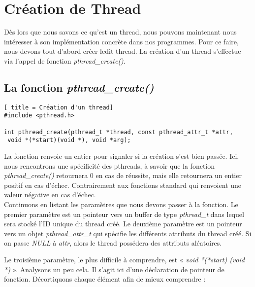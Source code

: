 \section{Création de Thread}
Dès lors que nous savons ce qu'est un thread, nous pouvons maintenant nous intéresser à son implémentation concrète dans nos programmes. Pour ce faire, nous devons tout d'abord créer ledit thread. La création d'un thread s'effectue via l'appel de fonction \textit{pthread\_create()}.
\\

\subsection{La fonction \textit{pthread\_create()}}
\begin{lstlisting}[ title = Création d'un thread]
#include <pthread.h>

int pthread_create(pthread_t *thread, const pthread_attr_t *attr,
 void *(*start)(void *), void *arg);
\end{lstlisting}
\vspace{\baselineskip}


La fonction renvoie un entier pour signaler si la création s'est bien passée. Ici, nous rencontrons une spécificité des pthreads, à savoir que la fonction \textit{pthread\_create()} retournera 0 en cas de réussite, mais elle retournera un entier positif en cas d'échec. Contrairement aux fonctions standard qui renvoient une valeur négative en cas d'échec.
\\

Continuons en listant les paramètres que nous devons passer à la fonction. Le premier paramètre est un pointeur vers un buffer de type \textit{pthread\_t} dans lequel sera stocké l'ID unique du thread créé. Le deuxième paramètre est un pointeur vers un objet \textit{pthread\_attr\_t} qui spécifie les différents attributs du thread créé. Si on passe \textit{NULL} à \textit{attr}, alors le thread possédera des attributs aléatoires.

Le troisième paramètre, le plus difficile à comprendre, est « \textit{void *(*start) (void *)} ». Analysons un peu cela. Il s'agit ici d'une déclaration de pointeur de fonction. Décortiquons chaque élément afin de mieux comprendre :



